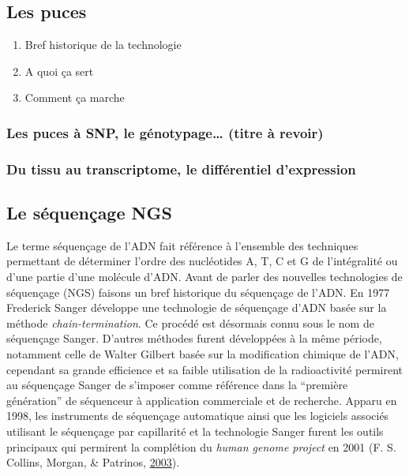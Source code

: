 \documentclass[12pt,twoside]{reedthesis}
\providecommand{\tightlist}{%
  \setlength{\itemsep}{0pt}\setlength{\parskip}{0pt}}
\theoremstyle{definition}
\theoremstyle{definition}
\theoremstyle{remark}
\begin{document}
  \subsection{Les puces}\label{les-puces}
  
  \begin{enumerate}
  \def\labelenumi{\arabic{enumi}.}
  \tightlist
  \item
    Bref historique de la technologie\\
  \item
    A quoi ça sert
  \item
    Comment ça marche
  \end{enumerate}
  
  \subsubsection{Les puces à SNP, le génotypage\ldots{} (titre à
  revoir)}\label{les-puces-a-snp-le-genotypage-titre-a-revoir}
  
  \subsubsection{Du tissu au transcriptome, le différentiel
  d'expression}\label{du-tissu-au-transcriptome-le-differentiel-dexpression}
  
  \subsection{Le séquençage NGS}\label{ngs}
  
  Le terme séquençage de l'ADN fait référence à l'ensemble des techniques
  permettant de déterminer l'ordre des nucléotides A, T, C et G de
  l'intégralité ou d'une partie d'une molécule d'ADN. Avant de parler des
  nouvelles technologies de séquençage (NGS) faisons un bref historique du
  séquençage de l'ADN. En 1977 Frederick Sanger développe une technologie
  de séquençage d'ADN basée sur la méthode \emph{chain-termination}. Ce
  procédé est désormais connu sous le nom de séquençage Sanger. D'autres
  méthodes furent développées à la même période, notamment celle de Walter
  Gilbert basée sur la modification chimique de l'ADN, cependant sa grande
  efficience et sa faible utilisation de la radioactivité permirent au
  séquençage Sanger de s'imposer comme référence dans la ``première
  génération'' de séquenceur à application commerciale et de recherche.
  Apparu en 1998, les instruments de séquençage automatique ainsi que les
  logiciels associés utilisant le séquençage par capillarité et la
  technologie Sanger furent les outils principaux qui permirent la
  complétion du \emph{human genome project} en 2001 (F. S. Collins,
  Morgan, \& Patrinos, \protect\hyperlink{ref-Collins2003}{2003}).
  
\end{document}
